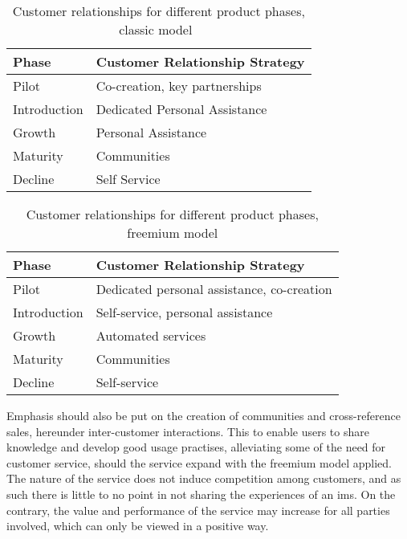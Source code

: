 \begin{table}[]
\centering
\caption{Customer relationships for different product phases, classic model~\cite{karlbernhoffbinde2015}}
\label{classiccr}
\begin{tabular}{|l|l|}
\hline
\textbf{Phase} & \textbf{Customer Relationship Strategy} \\ \hline
Pilot          & Co-creation, key partnerships           \\ \hline
Introduction   & Dedicated Personal Assistance           \\ \hline
Growth         & Personal Assistance                     \\ \hline
Maturity       & Communities                             \\ \hline
Decline        & Self Service                            \\ \hline
\end{tabular}
\end{table}


\begin{table}[]
\centering
\caption{Customer relationships for different product phases, freemium model}
\label{relationshipstrat}
\begin{tabular}{|l|l|}
\hline
\textbf{Phase} & \textbf{Customer Relationship Strategy}    \\ \hline
Pilot          & Dedicated personal assistance, co-creation \\ \hline
Introduction   & Self-service, personal assistance          \\ \hline
Growth         & Automated services                         \\ \hline
Maturity       & Communities                                \\ \hline
Decline        & Self-service                               \\ \hline
\end{tabular}
\end{table}

Emphasis should also be put on the creation of communities and cross-reference sales, hereunder inter-customer interactions. This to enable users to share knowledge and develop good usage practises, alleviating some of the need for customer service, should the service expand with the freemium model applied. The nature of the service does not induce competition among customers, and as such there is little to no point in not sharing the experiences of an \gls{ims}. On the contrary, the value and performance of the service may increase for all parties involved, which can only be viewed in a positive way. 


